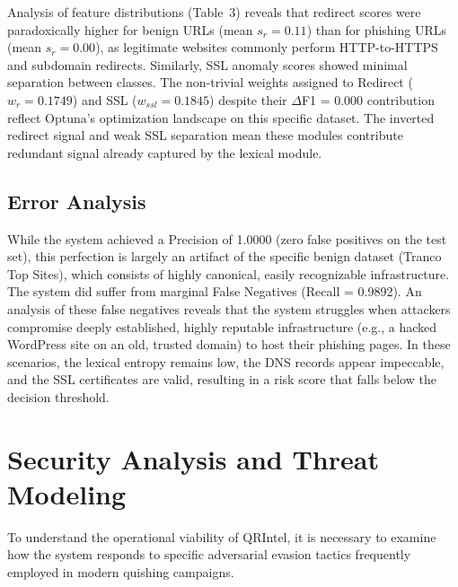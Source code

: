 \documentclass[10pt,twocolumn,letterpaper]{article}
\begin{document}
Analysis of feature distributions (Table~3) reveals that redirect scores were paradoxically higher for benign URLs (mean $s_r = 0.11$) than for phishing URLs (mean $s_r = 0.00$), as legitimate websites commonly perform HTTP-to-HTTPS and subdomain redirects. Similarly, SSL anomaly scores showed minimal separation between classes. The non-trivial weights assigned to Redirect ($w_r = 0.1749$) and SSL ($w_{ssl} = 0.1845$) despite their $\Delta$F1 = 0.000 contribution reflect Optuna's optimization landscape on this specific dataset. The inverted redirect signal and weak SSL separation mean these modules contribute redundant signal already captured by the lexical module. 

\subsection{Error Analysis}
While the system achieved a Precision of 1.0000 (zero false positives on the test set), this perfection is largely an artifact of the specific benign dataset (Tranco Top Sites), which consists of highly canonical, easily recognizable infrastructure. The system did suffer from marginal False Negatives (Recall = 0.9892). An analysis of these false negatives reveals that the system struggles when attackers compromise deeply established, highly reputable infrastructure (e.g., a hacked WordPress site on an old, trusted domain) to host their phishing pages. In these scenarios, the lexical entropy remains low, the DNS records appear impeccable, and the SSL certificates are valid, resulting in a risk score that falls below the decision threshold.

\section{Security Analysis and Threat Modeling}

To understand the operational viability of QRIntel, it is necessary to examine how the system responds to specific adversarial evasion tactics frequently employed in modern quishing campaigns.
\end{document}
